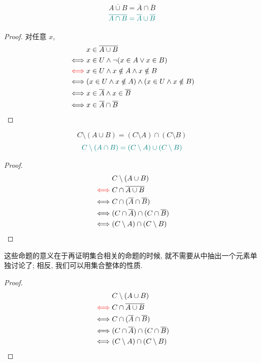 \begin{theorem}

  \[
    \overline{A \cup B} = \overline{A} \cap \overline{B}
  \]
  \[
    \textcolor{teal}{\overline{A \cap B} = \overline{A} \cup \overline{B}}
  \]
\end{theorem}
\begin{proof}
    对任意 $x$, 
  \setcounter{equation}{0}
  \begin{align*}
    &x \in \overline{A \cup B} \\
    \iff & x \in U \land \lnot (x \in A \lor x \in B) \\
    \textcolor{red}{\iff} & x \in U \land x \notin A \land x \notin B \\
    \iff & (x \in U \land x \notin A) \land (x \in U \land x \notin B) \\
    \iff & x \in \overline{A} \land x \in \overline{B} \\
    \iff & x \in \overline{A} \cap \overline{B}
  \end{align*}
\end{proof}

\begin{theorem}
  \[
    C \setminus (A \cup B) = (C \setminus A) \cap (C \setminus B)
  \]
  \[
    \textcolor{teal}{C \setminus (A \cap B) = (C \setminus A) \cup (C \setminus B)}
  \]
\end{theorem}

\begin{proof}
  \setcounter{equation}{0}
  \begin{align*}
    &C \setminus (A \cup B) \\
    \textcolor{red}{\iff} & C \cap \overline{A \cup B} \\
    \iff & C \cap (\overline{A} \cap \overline{B}) \\
    \iff & (C \cap \overline{A}) \cap (C \cap \overline{B}) \\
    \iff & (C \setminus A) \cap (C \setminus B)
  \end{align*}
\end{proof}

这些命题的意义在于再证明集合相关的命题的时候, 就不需要从中抽出一个元素单独讨论了; 相反, 我们可以用集合整体的性质. 

\begin{proof}
  \setcounter{equation}{0}
  \begin{align*}
    &C \setminus (A \cup B) \\
    \textcolor{red}{\iff} & C \cap \overline{A \cup B} \\
    \iff & C \cap (\overline{A} \cap \overline{B}) \\
    \iff & (C \cap \overline{A}) \cap (C \cap \overline{B}) \\
    \iff & (C \setminus A) \cap (C \setminus B)
  \end{align*}
\end{proof}

